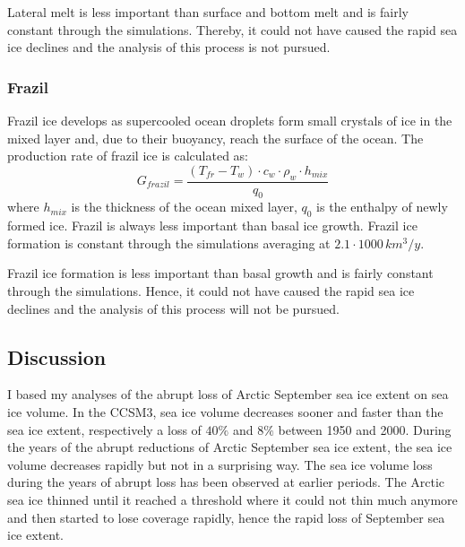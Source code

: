 Lateral melt is less important than surface and bottom melt and is fairly constant through the simulations.  Thereby, it could not have caused the rapid sea ice declines and the analysis of this process is not pursued. 



\subsubsection{Frazil}\label{frazil}

Frazil ice develops as supercooled ocean droplets form small crystals of ice in the mixed layer and, due to their buoyancy, reach the surface of the ocean. The production rate of frazil ice is calculated as:
\begin{equation}\label{eqfraz}
G_{frazil} = \frac{(T_{fr} - T_w)\cdot c_w \cdot \rho_w \cdot h_{mix}}{q_0} 
\end{equation}
where $h_{mix}$ is the thickness of the ocean mixed layer, $q_0$ is the enthalpy of newly formed ice. Frazil is always less important than basal ice growth. Frazil ice formation is constant through the simulations averaging at $2.1 \cdot 1000 \, km^3/y$.

Frazil ice formation is less important than basal growth and is fairly constant through the simulations.  Hence, it could not have caused the rapid sea ice declines and the analysis of this process will not be pursued. 



\subsection{Discussion}\label{conc1}

I based my analyses of the abrupt loss of Arctic September sea ice extent on sea ice volume. In the CCSM3, sea ice volume decreases sooner and faster than the sea ice extent, respectively a loss of $40\%$ and $8\%$ between 1950 and 2000. During the years of the abrupt reductions of Arctic September sea ice extent, the sea ice volume decreases rapidly but not in a surprising way. The sea ice volume loss during the years of abrupt loss has been observed at earlier periods. The Arctic sea ice thinned until it reached a threshold where it could not thin much anymore and then started to lose coverage rapidly, hence the rapid loss of September sea ice extent. 


